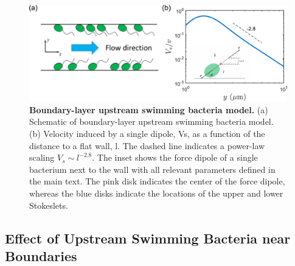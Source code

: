 \begin{figure}[!ht]
	\begin{center}
	\includegraphics[width=5.5 in]{Figs/3-Rheo/7a.pdf}
	\end{center}
	\caption[Boundary-layer Upstream Swimming Bacteria Model]
	{
	\textbf{Boundary-layer upstream swimming bacteria model.}
  (a) Schematic of boundary-layer upstream swimming bacteria model.
  (b) Velocity induced by a single dipole, Vs, as a function of the distance to a flat wall, l. The dashed line indicates a power-law scaling $V_s \sim l^{-2.8}$. The inset shows the force dipole of a single bacterium next to the wall with all relevant parameters defined in the main text. The pink disk indicates the center of the force dipole, whereas the blue disks indicate the locations of the upper and lower Stokeslets.
  }
  \label{fig:3-model}
\end{figure}


\subsection{Effect of Upstream Swimming Bacteria near Boundaries}

